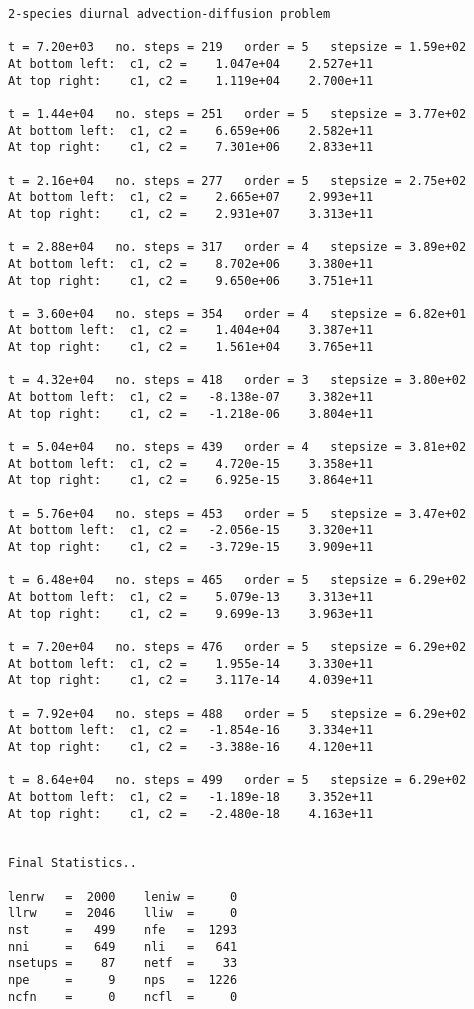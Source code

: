 \begin{verbatim}
2-species diurnal advection-diffusion problem

t = 7.20e+03   no. steps = 219   order = 5   stepsize = 1.59e+02
At bottom left:  c1, c2 =    1.047e+04    2.527e+11 
At top right:    c1, c2 =    1.119e+04    2.700e+11 

t = 1.44e+04   no. steps = 251   order = 5   stepsize = 3.77e+02
At bottom left:  c1, c2 =    6.659e+06    2.582e+11 
At top right:    c1, c2 =    7.301e+06    2.833e+11 

t = 2.16e+04   no. steps = 277   order = 5   stepsize = 2.75e+02
At bottom left:  c1, c2 =    2.665e+07    2.993e+11 
At top right:    c1, c2 =    2.931e+07    3.313e+11 

t = 2.88e+04   no. steps = 317   order = 4   stepsize = 3.89e+02
At bottom left:  c1, c2 =    8.702e+06    3.380e+11 
At top right:    c1, c2 =    9.650e+06    3.751e+11 

t = 3.60e+04   no. steps = 354   order = 4   stepsize = 6.82e+01
At bottom left:  c1, c2 =    1.404e+04    3.387e+11 
At top right:    c1, c2 =    1.561e+04    3.765e+11 

t = 4.32e+04   no. steps = 418   order = 3   stepsize = 3.80e+02
At bottom left:  c1, c2 =   -8.138e-07    3.382e+11 
At top right:    c1, c2 =   -1.218e-06    3.804e+11 

t = 5.04e+04   no. steps = 439   order = 4   stepsize = 3.81e+02
At bottom left:  c1, c2 =    4.720e-15    3.358e+11 
At top right:    c1, c2 =    6.925e-15    3.864e+11 

t = 5.76e+04   no. steps = 453   order = 5   stepsize = 3.47e+02
At bottom left:  c1, c2 =   -2.056e-15    3.320e+11 
At top right:    c1, c2 =   -3.729e-15    3.909e+11 

t = 6.48e+04   no. steps = 465   order = 5   stepsize = 6.29e+02
At bottom left:  c1, c2 =    5.079e-13    3.313e+11 
At top right:    c1, c2 =    9.699e-13    3.963e+11 

t = 7.20e+04   no. steps = 476   order = 5   stepsize = 6.29e+02
At bottom left:  c1, c2 =    1.955e-14    3.330e+11 
At top right:    c1, c2 =    3.117e-14    4.039e+11 

t = 7.92e+04   no. steps = 488   order = 5   stepsize = 6.29e+02
At bottom left:  c1, c2 =   -1.854e-16    3.334e+11 
At top right:    c1, c2 =   -3.388e-16    4.120e+11 

t = 8.64e+04   no. steps = 499   order = 5   stepsize = 6.29e+02
At bottom left:  c1, c2 =   -1.189e-18    3.352e+11 
At top right:    c1, c2 =   -2.480e-18    4.163e+11 


Final Statistics.. 

lenrw   =  2000    leniw =     0
llrw    =  2046    lliw  =     0
nst     =   499    nfe   =  1293
nni     =   649    nli   =   641
nsetups =    87    netf  =    33
npe     =     9    nps   =  1226
ncfn    =     0    ncfl  =     0
\end{verbatim}
